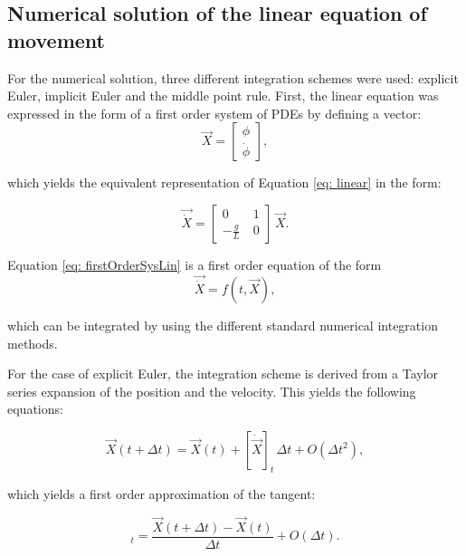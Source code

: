 \documentclass[12pt,bibstyle=none,pagenumberinfooter]{ifmdocument}
\begin{document}
\subsection{Numerical solution of the linear equation of movement}

For the numerical solution, three different integration schemes were used: explicit Euler, implicit Euler and the middle point rule. First, the linear equation was expressed in the form of a first order system of PDEs by defining a vector:
\begin{equation}
    \Vec{X} = \begin{bmatrix}
        \phi \\ \Dot{\phi} 
        \end{bmatrix},
\end{equation}

which yields the equivalent representation of Equation \ref{eq: linear} in the form:

\begin{equation}
    \Vec{\Dot{X}} = \begin{bmatrix}
        0 & 1 \\ -\frac{g}{L}\ & 0 
        \end{bmatrix} \, \Vec{X}.
        \label{eq: firstOrderSysLin}
\end{equation}

Equation \ref{eq: firstOrderSysLin} is a first order equation of the form
\begin{equation}
    \Vec{\Dot{X}} = f(t,\Vec{X}),
    \label{eq: GeneralIntForm}
\end{equation}

which can be integrated by using the different standard numerical integration methods.

For the case of explicit Euler, the integration scheme is derived from a Taylor series expansion of the position and the velocity. This yields the following equations:

\begin{equation}
    \Vec{X}(t+\Delta t) = \Vec{X}(t) + [\Dot{\Vec{X}}]_t\,\Delta t + {O(\Delta t^2)},
\end{equation}

which yields a first order approximation of the tangent:

\begin{equation}
    [\Vec{\Dot{X}}]_t = \frac{\Vec{X}(t+\Delta t)-\Vec{X}(t)}{\Delta t} + O\left(\Delta t\right).
    \label{eq: EulerTanApprox}
\end{equation}
\end{document}

